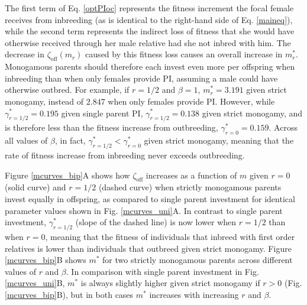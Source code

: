 \documentclass[12pt]{article}
\begin{document}
The first term of Eq. \ref{optPIoc} represents the fitness increment the focal female receives from inbreeding (as is identical to the right-hand side of Eq. \ref{maineq}), while the second term represents the indirect loss of fitness that she would have otherwise received through her male relative had she not inbred with him. The decrease in $\zeta_{\textrm{off}}(m_{r})$ caused by this fitness loss causes an overall increase in $m^{*}_{r}$. Monogamous parents should therefore each invest even more per offspring when inbreeding than when only females provide PI, assuming a male could have otherwise outbred. For example, if $r=1/2$ and $\beta=1$, $m^{*}_{r}= 3.191$ given strict monogamy, instead of $2.847$ when only females provide PI.  However, while $\gamma^{*}_{r=1/2}=0.195$ given single parent PI, $\gamma^{*}_{r=1/2}=0.138$ given strict monogamy, and is therefore less than the fitness increase from outbreeding, $\gamma^{*}_{r=0}=0.159$. Across all values of $\beta$, in fact, $\gamma^{*}_{r=1/2} < \gamma^{*}_{r=0}$ given strict monogamy, meaning that the rate of fitness increase from inbreeding never exceeds outbreeding. %

Figure \ref{mcurves_bip}A shows how $\zeta_{\textrm{off}}$ increases as a function of $m$ given $r=0$ (solid curve) and $r=1/2$ (dashed curve) when strictly monogamous parents invest equally in offspring, as compared to single parent investment for identical parameter values shown in Fig. \ref{mcurves_uni}A. In contrast to single parent investment, $\gamma^{*}_{r=1/2}$ (slope of the dashed line) is now lower when $r=1/2$ than when $r=0$, meaning that the fitness of individuals that inbreed with first order relatives is lower than individuals that outbreed given strict monogamy. Figure \ref{mcurves_bip}B shows $m^{*}$ for two strictly monogamous parents across different values of $r$ and $\beta$. In comparison with single parent investment in Fig. \ref{mcurves_uni}B, $m^{*}$ is always slightly higher given strict monogamy if $r>0$ (Fig. \ref{mcurves_bip}B), but in both cases $m^{*}$ increases with increasing $r$ and $\beta$. 
\end{document}
